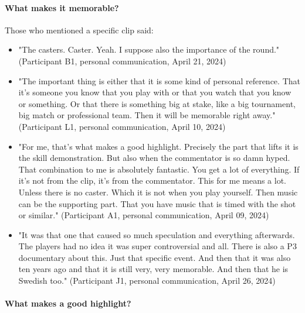 \paragraph{What makes it memorable?}
Those who mentioned a specific clip said:
\begin{itemize}
    \item "The casters. Caster. Yeah. I suppose also the importance of the round." (Participant B1, personal communication, April 21, 2024)
    \item "The important thing is either that it is some kind of personal reference. That it's someone you know that you play with or that you watch that you know or something. Or that there is something big at stake, like a big tournament, big match or professional team. Then it will be memorable right away." (Participant L1, personal communication, April 10, 2024)
    \item "For me, that's what makes a good highlight. Precisely the part that lifts it is the skill demonstration. But also when the commentator is so damn hyped. That combination to me is absolutely fantastic. You get a lot of everything. If it's not from the clip, it's from the commentator. This for me means a lot. Unless there is no caster. Which it is not when you play yourself. Then music can be the supporting part. That you have music that is timed with the shot or similar." (Participant A1, personal communication, April 09, 2024)
    \item "It was that one that caused so much speculation and everything afterwards. The players had no idea it was super controversial and all. There is also a P3 documentary about this. Just that specific event. And then that it was also ten years ago and that it is still very, very memorable. And then that he is Swedish too." (Participant J1, personal communication, April 26, 2024)
\end{itemize}
\paragraph{What makes a good highlight?}

